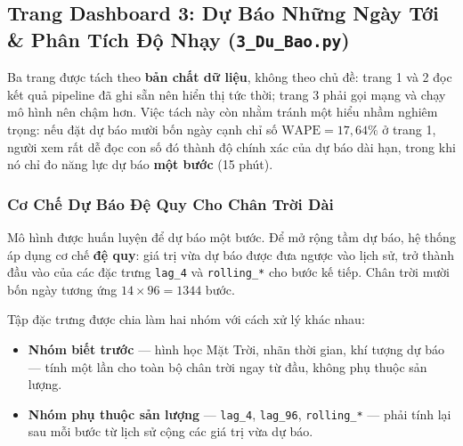 \documentclass[12pt,a4paper]{article}
\begin{document}
\subsection[Trang 3: Dự Báo Tới \& What-if]{Trang Dashboard 3: Dự Báo Những Ngày Tới \& Phân Tích Độ Nhạy (\texttt{3\_Du\_Bao.py})}

\begin{center}
\end{center}

Ba trang được tách theo \textbf{bản chất dữ liệu}, không theo chủ đề: trang 1 và 2 đọc kết quả pipeline đã ghi sẵn nên hiển thị tức thời; trang 3 phải gọi mạng và chạy mô hình nên chậm hơn. Việc tách này còn nhằm tránh một hiểu nhầm nghiêm trọng: nếu đặt dự báo mười bốn ngày cạnh chỉ số $\text{WAPE}=17{,}64\%$ ở trang 1, người xem rất dễ đọc con số đó thành độ chính xác của dự báo dài hạn, trong khi nó chỉ đo năng lực dự báo \textbf{một bước} (15 phút).

\subsubsection{Cơ Chế Dự Báo Đệ Quy Cho Chân Trời Dài}
Mô hình được huấn luyện để dự báo một bước. Để mở rộng tầm dự báo, hệ thống áp dụng cơ chế \textbf{đệ quy}: giá trị vừa dự báo được đưa ngược vào lịch sử, trở thành đầu vào của các đặc trưng \texttt{lag\_4} và \texttt{rolling\_*} cho bước kế tiếp. Chân trời mười bốn ngày tương ứng $14 \times 96 = 1344$ bước.

Tập đặc trưng được chia làm hai nhóm với cách xử lý khác nhau:
\begin{itemize}
    \item \textbf{Nhóm biết trước} --- hình học Mặt Trời, nhãn thời gian, khí tượng dự báo --- tính một lần cho toàn bộ chân trời ngay từ đầu, không phụ thuộc sản lượng.
    \item \textbf{Nhóm phụ thuộc sản lượng} --- \texttt{lag\_4}, \texttt{lag\_96}, \texttt{rolling\_*} --- phải tính lại sau mỗi bước từ lịch sử cộng các giá trị vừa dự báo.
\end{itemize}
\end{document}
